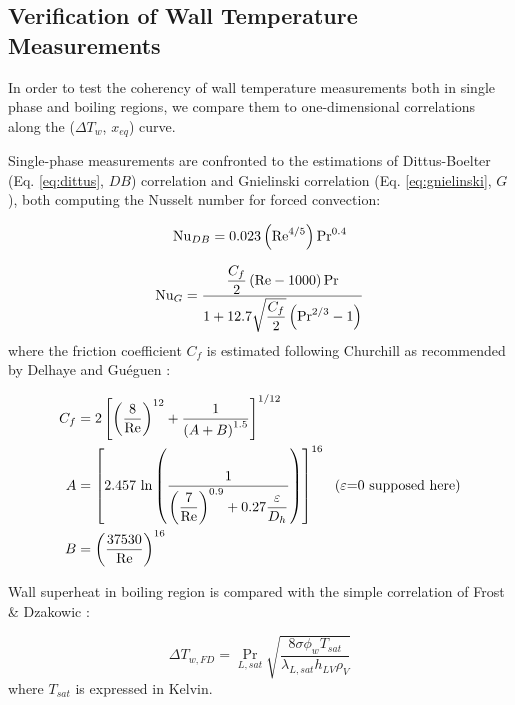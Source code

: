 \subsection{Verification of Wall Temperature Measurements}
\label{subsec:debora_Tw_verif}


In order to test the coherency of wall temperature measurements both in single phase and boiling regions, we compare them to one-dimensional correlations along the ($\Delta T_{w}$, $x_{eq}$) curve.

\npar

Single-phase measurements are confronted to the estimations of Dittus-Boelter (Eq. \ref{eq:dittus}, $DB$) correlation and Gnielinski correlation (Eq. \ref{eq:gnielinski}, $G$), both computing the Nusselt number for forced convection:

\begin{equation}
\mathrm{Nu}_{DB} = 0.023 \left( \mathrm{Re}^{4/5} \right) \mathrm{Pr}^{0.4}
\label{eq:dittus}
\end{equation}

\begin{equation}
\mathrm{Nu}_{G} = \frac{\dfrac{C_{f}}{2} \left( \mathrm{Re} - 1000 \right) \mathrm{Pr} }{1+12.7\sqrt{\dfrac{C_{f}}{2}} \left( \mathrm{Pr}^{2/3}-1 \right)}
\label{eq:gnielinski}
\end{equation}
where the friction coefficient $C_{f}$ is estimated following Churchill \cite{churchill_friction_1977} as recommended by Delhaye \cite{delhaye_thermohydraulique_2012} and Guéguen \cite{gueguen_contribution_2013}:

\begin{align}
C_{f} &= 2 \left[  \left( \frac{8}{\mathrm{Re}} \right)^{12} + \frac{1}{\left( A+B \right)^{1.5}}  \right]^{1/12} \\
\nonumber A &=\left[  2.457\ \mathrm{ln}\left(  \frac{1}{ \left( \dfrac{7}{\mathrm{Re}} \right)^{0.9} + 0.27 \dfrac{\varepsilon}{D_{h}} }  \right)  \right]^{16}\ \ \text{($\varepsilon$=0 supposed here)}\\
\nonumber B &= \left(  \frac{37530}{\mathrm{Re}}  \right)^{16}
\end{align}

\npar

Wall superheat in boiling region is compared with the simple correlation of Frost \& Dzakowic \cite{frost_extension_1967}:

\begin{equation}
\Delta T_{w,FD} = \Pr_{L,sat} \sqrt{\frac{8 \sigma \phi_{w} T_{sat}}{\lambda_{L,sat} h_{LV} \rho_{V}}} 
\label{eq:frost}
\end{equation}
where $T_{sat}$ is expressed in Kelvin.


